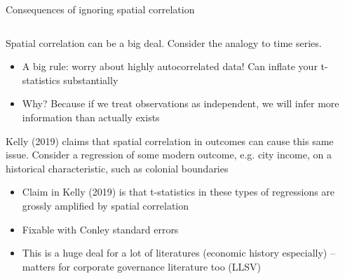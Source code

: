 \documentclass[notes,11pt, aspectratio=169]{beamer}
\newenvironment{wideitemize}{\itemize\addtolength{\itemsep}{10pt}}{\enditemize}
\begin{document}
\begin{frame}{Consequences of ignoring spatial correlation}
\begin{columns}[T] %
\begin{column}{.8\textwidth}
  \begin{wideitemize}
  \item Spatial correlation can be a big deal. Consider the analogy to time series.
    \begin{itemize}
    \item A big rule: worry about highly autocorrelated data! Can inflate your t-statistics substantially
    \item Why? Because if we treat observations as independent, we
      will infer more information than actually exists
    \end{itemize}
  \item Kelly (2019) claims that spatial correlation in outcomes can
    cause this same issue. Consider a regression of some modern
    outcome, e.g. city income, on a historical characteristic, such as
    colonial boundaries
    \begin{itemize}
    \item Claim in Kelly (2019) is that t-statistics in these types of regressions are grossly amplified by spatial correlation
    \item Fixable with Conley standard errors
    \item This is a huge deal for a lot of literatures (economic
      history especially) -- matters for corporate governance
      literature too (LLSV)
    \end{itemize}
  \end{wideitemize}
  \end{column}
  \hfill%
  \begin{column}{.3\textwidth}
  \end{column}
  \end{columns}
\end{frame}
\end{document}
